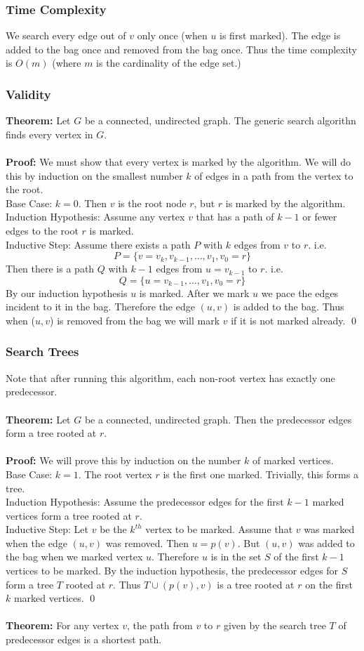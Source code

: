 \documentclass{article}
\newcommand{\thm}{\textbf{Theorem: }}
\newcommand{\proo}{\textbf{Proof: }}
\begin{document}
\subsubsection{Time Complexity}
We search every edge out of $v$ only once (when $u$ is first marked). The edge is added to the bag once and removed from the bag once. Thus the time complexity is $O(m)$ (where $m$ is the cardinality of the edge set.)
\subsubsection{Validity}
\thm Let $G$ be a connected, undirected graph. The generic search algorithn finds every vertex in $G$.\\\\
\proo We must show that every vertex is marked by the algorithm. We will do this by induction on the smallest number $k$ of edges in a path from the vertex to the root.\\
Base Case: $k=0$. Then $v$ is the root node $r$, but $r$ is marked by the algorithm.\\
Induction Hypothesis: Assume any vertex $v$ that has a path of $k-1$ or fewer edges to the root $r$ is marked.\\
Inductive Step: Assume there exists a path $P$ with $k$ edges from $v$ to $r$. i.e.
\[P = \{v = v_k, v_{k-1}, \dots, v_1, v_0 = r\}\]
Then there is a path $Q$ with $k-1$ edges from $u = v_{k-1}$ to $r$. i.e.
\[Q = \{u = v_{k-1}, \dots, v_1, v_0 = r\}\]
By our induction hypothesis $u$ is marked. After we mark $u$ we pace the edges incident to it in the bag. Therefore the edge $(u, v)$ is added to the bag. Thus when ($u, v$) is removed from the bag we will mark $v$ if it is not marked already.
\qed
\subsubsection{Search Trees}
Note that after running this algorithm, each non-root vertex has exactly one predecessor.\\\\
\thm Let $G$ be a connected, undirected graph. Then the predecessor edges form a tree rooted at $r$.\\\\
\proo We will prove this by induction on the number $k$ of marked vertices.\\
Base Case: $k=1$. The root vertex $r$ is the first one marked. Trivially, this forms a tree.\\
Induction Hypothesis: Assume the predecessor edges for the first $k-1$ marked vertices form a tree rooted at $r$.\\
Inductive Step: Let $v$ be the $k^{th}$ vertex to be marked. Assume that $v$ was marked when the edge $(u, v)$ was removed. Then $u = p(v)$. But $(u, v)$ was added to the bag when we marked vertex $u$. Therefore $u$ is in the set $S$ of the first $k-1$ vertices to be marked. By the induction hypothesis, the predecessor edges for $S$ form a tree $T$ rooted at $r$. Thus $T \cup (p(v), v)$ is a tree rooted at $r$ on the first $k$ marked vertices.
\qed\\\\
\thm For any vertex $v$, the path from $v$ to $r$ given by the search tree $T$ of predecessor edges is a shortest path.
\end{document}
